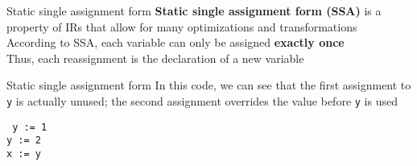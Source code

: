 \documentclass[../index.tex]{subfiles}
\begin{document}
\renewcommand{\currenttitle}{Static single assignment form}
\begin{frame}[fragile]{\currenttitle}
  \textbf{Static single assignment form (SSA)} is a property of IRs that allow
  for many optimizations and transformations \\[1.5em]

  According to SSA, each variable can only be assigned \textbf{exactly once} \\
  Thus, each reassignment is the declaration of a new variable
\end{frame}
  
\begin{frame}[fragile]{\currenttitle}
  In this code, we can see that the first assignment to \texttt{y} is actually
  unused; the second assignment overrides the value before \texttt{y} is used

  \texttt{%
    y := 1 \\
    y := 2 \\
    x := y
  } \\[1em]

\end{frame}
  
\end{document}
